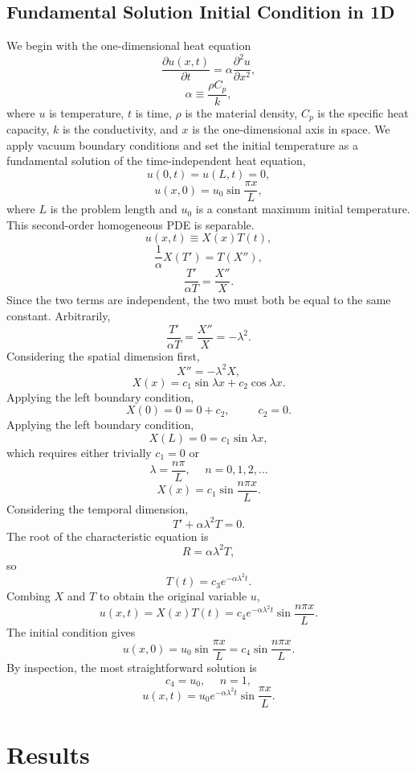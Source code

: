 \documentclass[11pt]{article} %
\newcommand{\drv}[2]{\ensuremath{\frac{\partial #1}{\partial #2}}}
\newcommand{\ddrv}[2]{\ensuremath{\frac{\partial^2 #1}{\partial #2^2}}}
\newcommand{\eqn}[1]{\begin{equation} #1 \end{equation}}
\begin{document}
\subsection{Fundamental Solution Initial Condition in 1D}
We begin with the one-dimensional heat equation
\eqn{\drv{u(x,t)}{t}=\alpha\ddrv{u}{x},}
\eqn{\alpha\equiv\frac{\rho C_p}{k},}
where $u$ is temperature, $t$ is time, $\rho$ is the material density, $C_p$ is the specific heat capacity, $k$ is the conductivity, and $x$ is the one-dimensional axis in space.  We apply vacuum boundary conditions and set the initial temperature as a fundamental solution of the time-independent heat equation,
\eqn{u(0,t)=u(L,t)=0,}
\eqn{u(x,0)=u_0\sin{\frac{\pi x}{L}},}
where $L$ is the problem length and $u_0$ is a constant maximum initial temperature.
This second-order homogeneous PDE is separable.
\eqn{u(x,t)\equiv X(x)T(t),}
\eqn{\frac{1}{\alpha}X(T')=T(X''),}
\eqn{\frac{T'}{\alpha T}=\frac{X''}{X}.}
Since the two terms are independent, the two must both be equal to the same constant. Arbitrarily,
\eqn{\frac{T'}{\alpha T}=\frac{X''}{X}=-\lambda^2.}
Considering the spatial dimension first,
\eqn{X''=-\lambda^2X,}
\eqn{X(x)=c_1\sin{\lambda x}+c_2\cos{\lambda x}.}
Applying the left boundary condition,
\eqn{X(0)=0=0+c_2,\hspace{30pt} c_2=0.}
Applying the left boundary condition,
\eqn{X(L)=0=c_1\sin{\lambda x},}
which requires either trivially $c_1=0$ or
\eqn{\lambda=\frac{n\pi}{L},\hspace{15pt}n=0,1,2,...}
\eqn{X(x)=c_1\sin{\frac{n\pi x}{L}}.}
Considering the temporal dimension,
\eqn{T'+\alpha\lambda^2 T=0.}
The root of the characteristic equation is
\eqn{R=\alpha\lambda^2 T,}
so \eqn{T(t)=c_3e^{-\alpha\lambda^2t}.}
Combing $X$ and $T$ to obtain the original variable $u$,
\eqn{u(x,t)=X(x)T(t)=c_4e^{-\alpha\lambda^2t}\sin{\frac{n\pi x}{L}}.}
The initial condition gives
\eqn{u(x,0)=u_0\sin{\frac{\pi x}{L}}=c_4\sin{\frac{n\pi x}{L}}.}
By inspection, the most straightforward solution is
\eqn{c_4=u_0,\hspace{15pt}n=1,}
\eqn{u(x,t)=u_0e^{-\alpha\lambda^2t}\sin{\frac{\pi x}{L}}.}

\section{Results}
\end{document}
